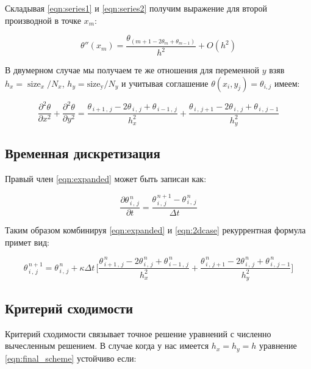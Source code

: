 \documentclass[a4paper]{extarticle}
\begin{document}
Складывая \eqref{eqn:series1} и \eqref{eqn:series2} получим выражение для второй производной в точке $x_m$:

\begin{equation}
\theta''(x_m) = \frac{\theta_{\left(m+1 - 2\theta_m + \theta_{m-1}\right)}}{h^2} + O(h^2)
\end{equation}

В двумерном случае мы получаем те же отношения для переменной $y$ взяв $h_x = \operatorname{size}_x/N_x$, $h_y = \operatorname{size_y}/N_y$ и учитывая соглашение $\theta(x_i,y_j) = \theta_{i,j}$ имеем:

\begin{equation}
\label{eqn:2dcase}
\frac{\partial^{2}\theta}{\partial x^{2}}+\frac{\partial^{2}\theta}{\partial y^{2}}=\frac{\theta_{\,i+1\,,\,j}-2\theta_{\,i\,,\,j}+\theta_{\,i-1\,,\,j}}{h_{x}^{2}}+\frac{\theta_{\,i\,,\,j+1}-2\theta_{\,i\,,\,j}+\theta_{\,i\,,\,j-1}}{h_{y}^{2}}
\end{equation}

\newpage

\subsection{Временная дискретизация}

Правый член \eqref{eqn:expanded} может быть записан как:

\begin{equation}
\frac{\partial \theta_{\,i\,,\,j}^{\,n}}{\partial t}=\frac{\theta_{\,i\,,\,j}^{\,n+1}-\theta_{\,i\,,\,j}^{\,n}}{\Delta t}
\end{equation}

Таким образом комбинируя \eqref{eqn:expanded} и \eqref{eqn:2dcase} рекуррентная формула примет вид:

\begin{equation}
\label{eqn:final_scheme}
\theta_{\,i\,,\,j}^{\,n+1}=\theta_{\,i\,,\,j}^{\,n}+\kappa \Delta t\,\bigg[\dfrac{\theta_{\,i+1\,,\,j}^{\,n}-2\theta_{\,i\,,\,j}^{\,n}+
	\theta_{\,i-1\,,\,j}^{\,n}}{h_{x}^{2}}+\dfrac{\theta_{\,i\,,\,j+1}^{\,n}-2\theta_{\,i\,,\,j}^{\,n}+\theta_{\,i\,,\,j-1}^{\,n}}{h_{y}^{2}}\bigg]
\end{equation}

\subsection{Критерий сходимости}

Критерий сходимости связывает точное решение уравнений с численно вычесленным решением. В случае когда у нас имеется  $h_x = h_y = h$ уравнение \eqref{eqn:final_scheme} устойчиво если:
\end{document}

